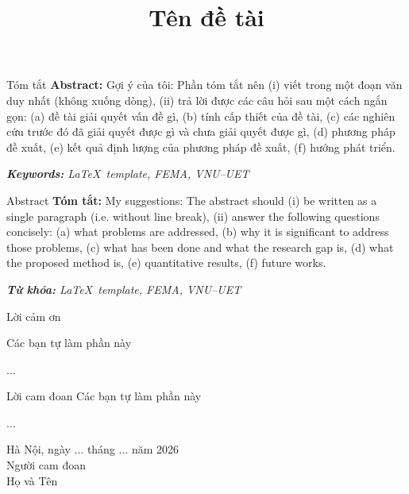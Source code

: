 \documentclass[thesis]{femathesis}
\begin{document}
\title{Tên đề tài}
\makecovers


\begin{preamble}{Tóm tắt}
\textbf{Abstract:}
Gợi ý của tôi: Phần tóm tắt nên (i) viết trong một đoạn văn duy nhất (không xuống dòng), (ii) trả lời được các câu hỏi sau một cách ngắn gọn: (a) đề tài giải quyết vấn đề gì, (b) tính cấp thiết của đề tài, (c) các nghiên cứu trước đó đã giải quyết được gì và chưa giải quyết được gì, (d) phương pháp đề xuất, (e) kết quả định lượng của phương pháp đề xuất, (f) hướng phát triển. 

\textit{\textbf{Keywords:} \LaTeX~template, FEMA, VNU--UET}
\end{preamble}


\begin{preamble}{Abstract}
\textbf{Tóm tắt:}
My suggestions: The abstract should (i) be written as a single paragraph (i.e. without line break), (ii) answer the following questions concisely: (a) what problems are addressed, (b) why it is significant to address those problems, (c) what has been done and what the research gap is, (d) what the proposed method is, (e) quantitative results, (f) future works. 

\textit{\textbf{Từ khóa:} \LaTeX~template, FEMA, VNU--UET}
\end{preamble}


\begin{preamble}{Lời cảm ơn}

\hspace*{1.25em} Các bạn tự làm phần này

\hspace*{1.25em} ...
\end{preamble}


\begin{preamble}{Lời cam đoan}
\hspace*{1.25em} Các bạn tự làm phần này

\hspace*{1.25em} ...

\vspace{2em}

\begin{flushright}
    \begin{minipage}{7cm}
    \centering
    Hà Nội, ngày  ...  tháng  ...  năm 2026\\
    Người cam đoan\\[4em]

    Họ và Tên
    \end{minipage}
\end{flushright}

\end{preamble}
\end{document}
